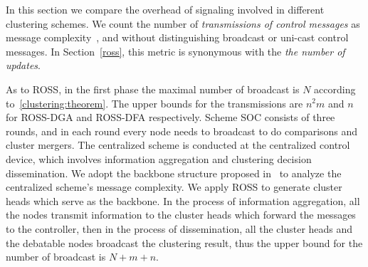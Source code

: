 \documentclass[times]{ettauth}
\theoremstyle{mytheoremstyle}
\theoremstyle{mytheoremstyle}
\theoremstyle{mytheoremstyle}
\begin{document}
In this section we compare the overhead of signaling involved in different clustering schemes.
We count the number of \textit{transmissions of control messages} as message complexity~\cite{complexity_aggregation_2011}, and without distinguishing broadcast or uni-cast control messages.
In Section~\ref{ross}, this metric is synonymous with the \textit{the number of updates}.



As to ROSS, in the first phase the maximal number of broadcast is $N$ according to~\ref{clustering:theorem}.
The upper bounds for the transmissions are $n^2m$ and $n$ for ROSS-DGA and ROSS-DFA respectively.
Scheme SOC consists of three rounds, and in each round every node needs to broadcast to do comparisons and cluster mergers.
The centralized scheme is conducted at the centralized control device, which involves information aggregation and clustering decision dissemination.
We adopt the backbone structure proposed in~\cite{Efficient_broadcasting_gathering_adhoc} to analyze the centralized scheme's message complexity.
We apply ROSS to generate cluster heads which serve as the backbone.
In the process of information aggregation, all the nodes transmit information to the cluster heads which forward the messages to the controller, then in the process of dissemination, all the cluster heads and the debatable nodes broadcast the clustering result, thus the upper bound for the number of broadcast is $N+m+n$.
\end{document}
